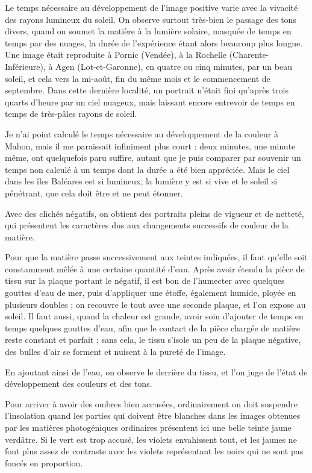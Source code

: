 \documentclass[a4paper, 11pt, oneside, polutonikogreek, french]{article}
\begin{document}
Le temps nécessaire au développement de l'image positive varie avec la vivacité des rayons lumineux du soleil. On observe surtout très-bien le passage des tons divers, quand on soumet la matière à la lumière solaire, masquée de temps en temps par des nuages, la durée de l'expérience étant alors beaucoup plus longue. Une image était reproduite à Pornic (Vendée), à la Rochelle (Charente-Inférieure), à Agen (Lot-et-Garonne), en quatre ou cinq minutes, par un beau soleil, et cela vers la mi-août, fin du même mois et le commencement de septembre. Dans cette dernière localité, un portrait n'était fini qu'après trois quarts d'heure par un ciel nuageux, mais laissant encore entrevoir de temps en temps de très-pâles rayons de soleil.

Je n'ai point calculé le temps nécessaire au développement de la couleur à Mahon, mais il me paraissait infiniment plus court : deux minutes, une minute même, ont quelquefois paru suffire, autant que je puis comparer par souvenir un temps non calculé à un temps dont la durée a été bien appréciée. Mais le ciel dans les îles Baléares est si lumineux, la lumière y est si vive et le soleil si pénétrant, que cela doit être et ne peut étonner.

Avec des clichés négatifs, on obtient des portraits pleins de vigueur et de netteté, qui présentent les caractères dus aux changements successifs de couleur de la matière.

Pour que la matière passe successivement aux teintes indiquées, il faut qu'elle soit constamment mêlée à une certaine quantité d'eau. Après avoir étendu la pièce de tissu sur la plaque portant le négatif, il est bon de l'humecter avec quelques gouttes d'eau de mer, puis d'appliquer une étoffe, également humide, ployée en plusieurs doubles ; on recouvre le tout avec une seconde plaque, et l'on expose au soleil. Il faut aussi, quand la chaleur est grande, avoir soin d'ajouter de temps en temps quelques gouttes d'eau, afin que le contact de la pièce chargée de matière reste constant et parfait ; sans cela, le tissu s'isole un peu de la plaque négative, des bulles d'air se forment et nuisent à la pureté de l'image.

En ajoutant ainsi de l'eau, on observe le derrière du tissu, et l'on juge de l'état de développement des couleurs et des tons.

Pour arriver à avoir des ombres bien accusées, ordinairement on doit suspendre l'insolation quand les parties qui doivent être blanches dans les images obtenues par les matières photogéniques ordinaires présentent ici une belle teinte jaune verdâtre. Si le vert est trop accusé, les violets envahissent tout, et les jaunes ne font plus assez de contraste avec les violets représentant les noirs qui ne sont pas foncés en proportion.
\end{document}
